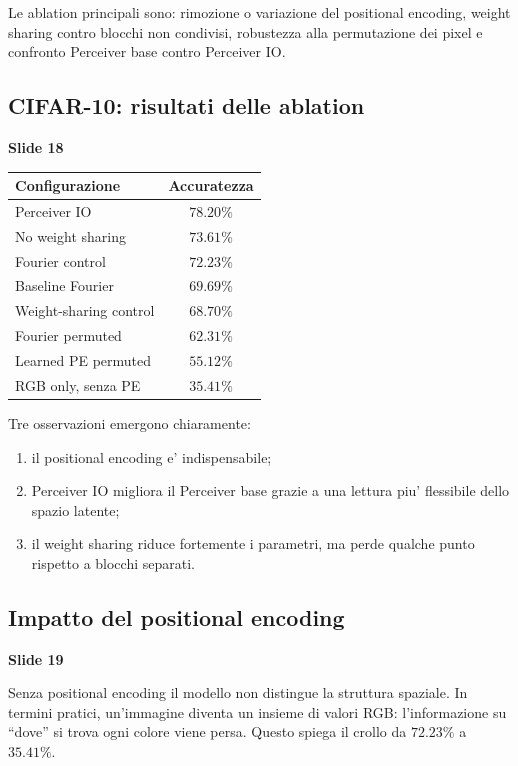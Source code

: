\documentclass[11pt,a4paper]{article}
\newcommand{\slide}[1]{\textcolor{mainblue}{\textbf{Slide #1}}}
\begin{document}
Le ablation principali sono: rimozione o variazione del positional encoding,
weight sharing contro blocchi non condivisi, robustezza alla permutazione dei
pixel e confronto Perceiver base contro Perceiver IO.

\subsection{CIFAR-10: risultati delle ablation}
\slide{18}

\begin{center}
\begin{tabular}{lc}
\toprule
\textbf{Configurazione} & \textbf{Accuratezza} \\
\midrule
Perceiver IO & $78.20\%$ \\
No weight sharing & $73.61\%$ \\
Fourier control & $72.23\%$ \\
Baseline Fourier & $69.69\%$ \\
Weight-sharing control & $68.70\%$ \\
Fourier permuted & $62.31\%$ \\
Learned PE permuted & $55.12\%$ \\
RGB only, senza PE & $35.41\%$ \\
\bottomrule
\end{tabular}
\end{center}

Tre osservazioni emergono chiaramente:
\begin{enumerate}
  \item il positional encoding e' indispensabile;
  \item Perceiver IO migliora il Perceiver base grazie a una lettura piu'
  flessibile dello spazio latente;
  \item il weight sharing riduce fortemente i parametri, ma perde qualche punto
  rispetto a blocchi separati.
\end{enumerate}

\subsection{Impatto del positional encoding}
\slide{19}

Senza positional encoding il modello non distingue la struttura spaziale. In
termini pratici, un'immagine diventa un insieme di valori RGB: l'informazione su
``dove'' si trova ogni colore viene persa. Questo spiega il crollo da
$72.23\%$ a $35.41\%$.
\end{document}

